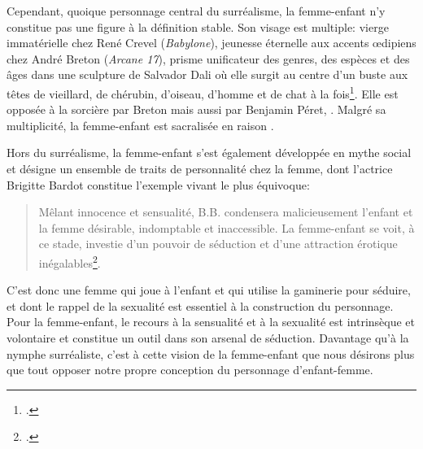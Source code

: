 Cependant, quoique personnage central du surréalisme, la femme-enfant n'y constitue pas une figure à la définition stable. Son visage est multiple: vierge immatérielle chez René Crevel (\textit{Babylone}), jeunesse éternelle aux accents \oe{}dipiens chez André Breton (\textit{Arcane 17}), prisme unificateur des genres, des espèces et des âges dans une sculpture de Salvador Dali où elle surgit au centre d'un buste aux têtes de vieillard, de chérubin, d'oiseau, d'homme et de chat à la fois\footcite[303]{Inglin-Routisseau2006}. Elle est opposée à la sorcière par Breton mais aussi par Benjamin Péret, .
Malgré sa multiplicité, la femme-enfant est sacralisée en raison .
\par
Hors du surréalisme, la femme-enfant s'est également développée en mythe social et désigne un ensemble de traits de personnalité chez la femme, dont l'actrice Brigitte Bardot constitue l'exemple vivant le plus équivoque:
\begin{quote}
  \begin{singlespace}
    \small
    Mêlant innocence et sensualité, B.B. condensera malicieusement l'enfant et la femme désirable, indomptable et inaccessible. La femme-enfant se voit, à ce stade, investie d'un pouvoir de séduction et d'une attraction érotique inégalables\footcite[307]{Inglin-Routisseau2006}.
    \normalsize
  \end{singlespace}
\end{quote}
C'est donc une femme qui joue à l'enfant et qui utilise la gaminerie pour séduire, et dont le rappel de la sexualité est essentiel à la construction du personnage.
Pour la femme-enfant, le recours à la sensualité et à la sexualité est intrinsèque et volontaire et constitue un outil dans son arsenal de séduction.
Davantage qu'à la nymphe surréaliste, c'est à cette vision de la femme-enfant que nous désirons plus que tout opposer notre propre conception du personnage d'enfant-femme.

